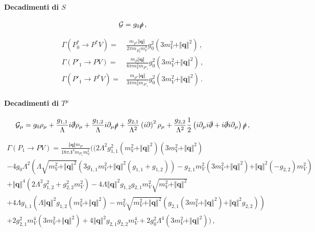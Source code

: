 \documentclass{article}
\begin{document}
\paragraph{Decadimenti di $S$}
\begin{equation}
  \mathcal{G} = g_0 \slashed{\rho} \, , 
\end{equation}

\begin{align}
  \Gamma\left( P^*_0 \to P^* V \right) =& \frac{m_{P^*} \Vert \mathbf{q} \Vert}{2 \pi  m_{P_0^*} m_V^2} g_0^2 \left(3 m_V^2+ \Vert \mathbf{q} \Vert^2\right) \, , \\
  \Gamma\left( P'_1 \to P V \right) =& \frac{m_P \Vert \mathbf{q} \Vert}{6 \pi  m_V^2 m_{P'_1}} g_0^2 \left(3 m_V^2+ \Vert \mathbf{q} \Vert^2\right) \, , \\
  \Gamma\left( P'_1 \to P^* V \right) =& \frac{m_{P^*} \Vert \mathbf{q} \Vert }{3 \pi  m_V^2 m_{P'_1}} g_0^2 \left(3 m_V^2+ \Vert \mathbf{q} \Vert^2\right) \, . 
\end{align}

\paragraph{Decadimenti di $T^\mu$}
\begin{equation}
  \mathcal{G}_\mu = g_0 \rho_\mu + \frac{g_{1,1}}{\Lambda} i \slashed{\partial} \rho_\mu + \frac{g_{1,2}}{\Lambda} i \partial_\mu \slashed{\rho} + \frac{g_{2,1}}{\Lambda^2} \left( i \partial \right)^2 \rho_\mu + \frac{g_{2,2}}{\Lambda^2} \frac{1}{2} \left( i \partial_\mu i \slashed{\partial} + i \slashed{\partial} i \partial_\mu \right) \slashed{\rho} \, ,
\end{equation}

\begin{multline}
  \Gamma\left( P_1 \to P V \right) = \frac{\Vert \mathbf{q} \Vert m_P }{18 \pi  \Lambda ^4 m_{P_1} m_V^2}
  \Bigg( (2 \Lambda ^2 g_{1,1}^2 \left(m_V^2+\Vert \mathbf{q} \Vert^2\right) \left(3 m_V^2+\Vert \mathbf{q} \Vert^2\right) \\
  -4 g_0 \Lambda ^2 \left(\Lambda  \sqrt{m_V^2+\Vert \mathbf{q} \Vert^2} \left(3 g_{1,1} m_V^2+\Vert \mathbf{q} \Vert^2 \left(g_{1,1}+g_{1,2}\right)\right)-g_{2,1} m_V^2 \left(3 m_V^2+\Vert \mathbf{q} \Vert^2\right)+\Vert \mathbf{q} \Vert^2 \left(-g_{2,2}\right) m_V^2\right) \\
 +\Vert \mathbf{q} \Vert^4 \left(2 \Lambda ^2 g_{1,2}^2+g_{2,2}^2 m_V^2\right)-4 \Lambda  \Vert \mathbf{q} \Vert^2 g_{1,2} g_{2,1} m_V^2 \sqrt{m_V^2+\Vert \mathbf{q} \Vert^2} \\
 +4 \Lambda  g_{1,1} \left(\Lambda  \Vert \mathbf{q} \Vert^2 g_{1,2} \left(m_V^2+\Vert \mathbf{q} \Vert^2\right)-m_V^2 \sqrt{m_V^2+\Vert \mathbf{q} \Vert^2} \left(g_{2,1} \left(3 m_V^2+\Vert \mathbf{q} \Vert^2\right)+\Vert \mathbf{q} \Vert^2 g_{2,2}\right)\right) \\
 +2 g_{2,1}^2 m_V^4 \left(3 m_V^2+\Vert \mathbf{q} \Vert^2\right)+4 \Vert \mathbf{q} \Vert^2 g_{2,1} g_{2,2} m_V^4+2 g_0^2 \Lambda ^4 \left(3 m_V^2+\Vert \mathbf{q} \Vert^2\right)\Bigg) \, ,
\end{multline}
\end{document}
